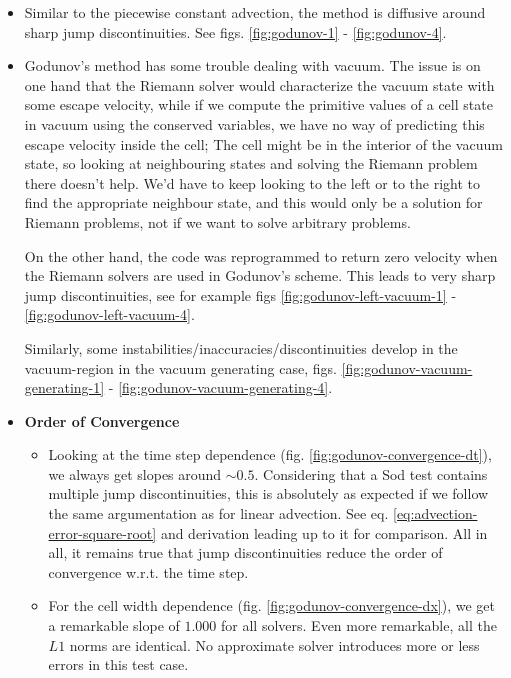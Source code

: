 \begin{itemize}


	\item 	Similar to the piecewise constant advection, the method is diffusive around sharp jump discontinuities.
			See figs. \ref{fig:godunov-1} - \ref{fig:godunov-4}.




	\item 	Godunov's method has some trouble dealing with vacuum.
			The issue is on one hand that the Riemann solver would characterize the vacuum state with some escape velocity, while if we compute the primitive values of a cell state in vacuum using the conserved variables, we have no way of predicting this escape velocity inside the cell;
			The cell might be in the interior of the vacuum state, so looking at neighbouring states and solving the Riemann problem there doesn't help.
			We'd have to keep looking to the left or to the right to find the appropriate neighbour state, and this would only be a solution for Riemann problems, not if we want to solve arbitrary problems.
			
			On the other hand, the code was reprogrammed to return zero velocity when the Riemann solvers are used in Godunov's scheme.
			This leads to very sharp jump discontinuities, see for example figs \ref{fig:godunov-left-vacuum-1} - \ref{fig:godunov-left-vacuum-4}.
			
			Similarly, some instabilities/inaccuracies/discontinuities develop in the vacuum-region in the vacuum generating case, figs. \ref{fig:godunov-vacuum-generating-1} - \ref{fig:godunov-vacuum-generating-4}.

	\item \textbf{Order of Convergence}
	
		\begin{itemize}
			
			\item 	Looking at the time step dependence (fig. \ref{fig:godunov-convergence-dt}), we always get slopes around $\sim 0.5$.
					Considering that a Sod test contains multiple jump discontinuities, this is absolutely as expected if we follow the same argumentation as for linear advection.
					See eq. \ref{eq:advection-error-square-root} and derivation leading up to it for comparison.
					All in all, it remains true that jump discontinuities reduce the order of convergence w.r.t. the time step.
					
			\item 	For the cell width dependence (fig. \ref{fig:godunov-convergence-dx}), we get a remarkable slope of $1.000$ for all solvers.
					Even more remarkable, all the $L1$ norms are identical.
					No approximate solver introduces more or less errors in this test case.
			

\end{itemize}
\end{itemize}

